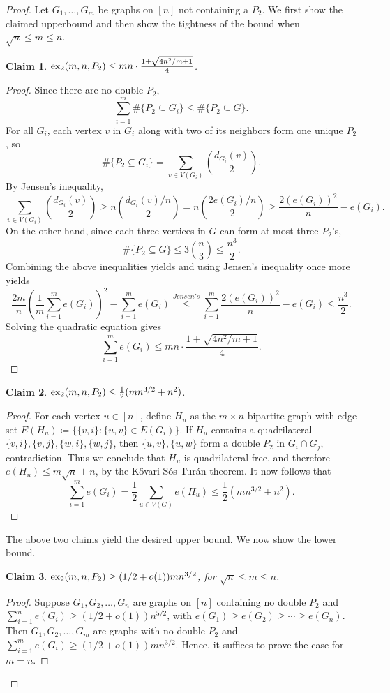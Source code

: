 \documentclass[12pt]{report}
\newtheorem{claim}{Claim}[theorem]
\newcommand*{\dex}{\textnormal{ex}_2}
\begin{document}
\begin{proof}
  Let $G_1, \ldots, G_m$ be graphs on $[n]$ not containing a $P_2$. We first show the claimed upperbound and then show the tightness of the bound when $\sqrt{n} \leq m \leq n$.
  \begin{claim}
    $\dex(m, n, P_2) \leq mn \cdot \frac{1 + \sqrt{4n^2/m + 1}}{4}$.
  \end{claim}

  \begin{proof}
    Since there are no double $P_2$,
    \[
    \sum_{i = 1}^m \#\{P_2 \subseteq G_i\} \leq \#\{P_2 \subseteq G\}.
    \]
    For all $G_i$, each vertex $v$ in $G_i$ along with two of its neighbors form one unique $P_2$, so
    \[
      \#\{P_2 \subseteq G_i\} = \sum_{v \in V(G_i)} \binom{d_{G_i}(v)}{2}.
    \]
    By Jensen's inequality,
    \[
      \sum_{v \in V(G_i)} \binom{d_{G_i}(v)}{2} \geq n\binom{d_{G_i}(v)/n}{2} = n\binom{2e(G_i)/n}{2} \geq \frac{2(e(G_i))^2}{n} - e(G_i).
    \]
    On the other hand, since each three vertices in $G$ can form at most three $P_2$'s, 
    \[
      \#\{P_2 \subseteq G\} \leq 3\binom{n}{3} \leq \frac{n^3}{2}.
    \]
    Combining the above inequalities yields and using Jensen's inequality once more yields
    \[
      \frac{2m}{n}\left(\frac{1}{m}\sum_{i = 1}^m e(G_i)\right)^2 - \sum_{i = 1}^m e(G_i) \overset{Jensen's}{\leq} \sum_{i = 1}^m \frac{2(e(G_i))^2}{n} - e(G_i) \leq \frac{n^3}{2}.
    \]
    Solving the quadratic equation gives
    \[
      \sum_{i = 1}^m e(G_i) \leq mn \cdot \frac{1 + \sqrt{4n^2/m + 1}}{4}.
    \]
  \end{proof}

  \begin{claim}
    $\dex(m, n, P_2) \leq \frac{1}{2}(mn^{3/2} + n^2)$. 
  \end{claim}

  \begin{proof}
    For each vertex $u \in [n]$, define $H_u$ as the $m \times n$ bipartite graph with edge set $E(H_u) \coloneq \{\{v, i\} : \{u, v\} \in E(G_i)\}$. If $H_u$ contains a quadrilateral $\{v, i\}, \{v, j\}, \{w, i\}, \{w, j\}$, then $\{u, v\}, \{u, w\}$ form a double $P_2$ in $G_i \cap G_j$, contradiction. Thus we conclude that $H_u$ is quadrilateral-free, and therefore $e(H_u) \leq m\sqrt{n} + n$, by the Kővari-Sós-Turán theorem. It now follows that
    \[
      \sum_{i = 1}^m e(G_i) = \frac{1}{2}\sum_{u \in V(G)} e(H_u) \leq \frac{1}{2}(mn^{3/2} + n^2).
    \]
  \end{proof}
  The above two claims yield the desired upper bound. We now show the lower bound.
  \begin{claim}
    $\dex(m, n, P_2) \geq (1/2 + o(1))mn^{3/2}$, for $\sqrt{n} \leq m \leq n$.
  \end{claim}
  \begin{proof}
    Suppose $G_1, G_2, \ldots, G_n$ are graphs on $[n]$ containing no double $P_2$ and $\sum_{i = 1}^n e(G_i) \geq (1/2 + o(1))n^{5/2}$, with $e(G_1) \geq e(G_2) \geq \cdots \geq e(G_n)$. Then $G_1, G_2, \ldots, G_m$ are graphs with no double $P_2$ and $\sum_{i = 1}^m e(G_i) \geq (1/2 + o(1))mn^{3/2}$. Hence, it suffices to prove the case for $m = n$.


\end{proof}
\end{proof}
\end{document}
